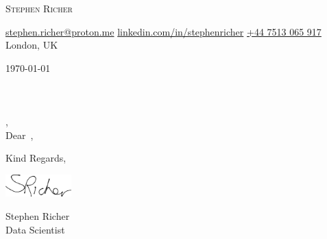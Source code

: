 \documentclass[12pt]{letter}
\makeatletter
\newcommand{\myname}{Stephen Richer}
\newcommand{\mytitle}{Data Scientist}
\newcommand{\myemail}{stephen.richer@proton.me}
\newcommand{\mylinkedin}{stephenricher}
\newcommand{\myphone}{+44 7513 065 917}
\newcommand{\mylocation}{London, UK}
\newcommand{\greeting}{Dear}
\newcommand{\closer}{Kind Regards}
\makeatother
\begin{document}
\begin{center}
{\fontsize{28}{0}\selectfont\scshape \myname}

\href{mailto:\myemail}{\faEnvelope\enspace \myemail}\hfill
\href{https://linkedin.com/in/\mylinkedin}{\faLinkedin\enspace linkedin.com/in/\mylinkedin}\hfill
\href{tel:\myphone}{\faPhone\enspace \myphone}\hfill
\faMapMarker\enspace \mylocation
\end{center}

\vspace{0.2in}

\today\\

\vspace{-0.1in}\recipient\\
\company\\
\street\\
\city, \state\ \zip\\

\vspace{-0.1in}\greeting\ \recipient,\\

\vspace{-0.1in}\setlength\parindent{24pt}
\noindent

\vspace{0.1in}
\vfill

\begin{flushright}
\closer,

\vspace{-0.1in}\includegraphics[width=1in]{signature.png}\vspace{-0.1in}

\myname\\
\mytitle
\end{flushright}

\nocite{*}
\end{document}
